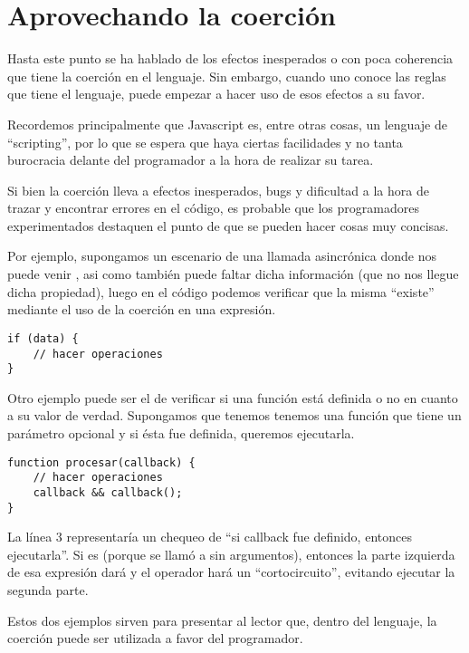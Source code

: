 \section{Aprovechando la coerción}
\label{sec:aprovechando}

Hasta este punto se ha hablado de los efectos inesperados o con poca coherencia que tiene la coerción en el lenguaje. Sin embargo, cuando uno conoce las reglas que tiene el lenguaje, puede empezar a hacer uso de esos efectos a su favor.

Recordemos principalmente que Javascript es, entre otras cosas, un lenguaje de "`scripting"', por lo que se espera que haya ciertas facilidades y no tanta burocracia delante del programador a la hora de realizar su tarea.

Si bien la coerción lleva a efectos inesperados, bugs y dificultad a la hora de trazar y encontrar errores en el código, es probable que los programadores experimentados destaquen el punto de que se pueden hacer cosas muy concisas.

Por ejemplo, supongamos un escenario de una llamada asincrónica donde nos puede venir , asi como también puede faltar dicha información (que no nos llegue dicha propiedad), luego en el código podemos verificar que la misma "`existe"' mediante el uso de la coerción en una expresión.

\begin{lstlisting}
if (data) {
	// hacer operaciones
}
\end{lstlisting}

Otro ejemplo puede ser el de verificar si una función está definida o no en cuanto a su valor de verdad. Supongamos que tenemos tenemos una función que tiene un parámetro opcional  y si ésta fue definida, queremos ejecutarla.

\begin{lstlisting}
function procesar(callback) {
	// hacer operaciones
	callback && callback();
}
\end{lstlisting}

La línea 3 representaría un chequeo de "`si callback fue definido, entonces ejecutarla"'. Si  es  (porque se llamó a  sin argumentos), entonces la parte izquierda de esa expresión dará  y el operador \code{\&\&} hará un "`cortocircuito"', evitando ejecutar la segunda parte.

Estos dos ejemplos sirven para presentar al lector que, dentro del lenguaje, la coerción puede ser utilizada a favor del programador.